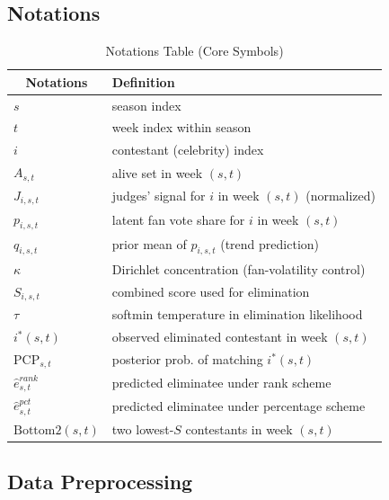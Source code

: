 \documentclass[12pt]{article}
\begin{document}
\subsection{Notations}
\begin{table}[H]
	\centering
	\small
	\begin{tabular}{ll}
		\hline
		\hline
		\multicolumn{1}{c}{\textbf{Notations}} & \textbf{Definition}\\
		\hline
		$s$ & season index \\
		$t$ & week index within season \\
		$i$ & contestant (celebrity) index \\
		$A_{s,t}$ & alive set in week $(s,t)$ \\
		$J_{i,s,t}$ & judges' signal for $i$ in week $(s,t)$ (normalized) \\
		$p_{i,s,t}$ & latent fan vote share for $i$ in week $(s,t)$ \\
		$q_{i,s,t}$ & prior mean of $p_{i,s,t}$ (trend prediction) \\
		$\kappa$ & Dirichlet concentration (fan-volatility control) \\
		$S_{i,s,t}$ & combined score used for elimination \\
		$\tau$ & softmin temperature in elimination likelihood \\
		$i^*(s,t)$ & observed eliminated contestant in week $(s,t)$ \\
		$\mathrm{PCP}_{s,t}$ & posterior prob. of matching $i^*(s,t)$ \\
		$\widehat e^{rank}_{s,t}$ & predicted eliminatee under rank scheme \\
		$\widehat e^{pct}_{s,t}$ & predicted eliminatee under percentage scheme \\
		$\text{Bottom2}(s,t)$ & two lowest-$S$ contestants in week $(s,t)$ \\
		\hline
		\hline
	\end{tabular}
	\caption{Notations Table (Core Symbols)}
\end{table}




\subsection{Data Preprocessing}
\end{document}
